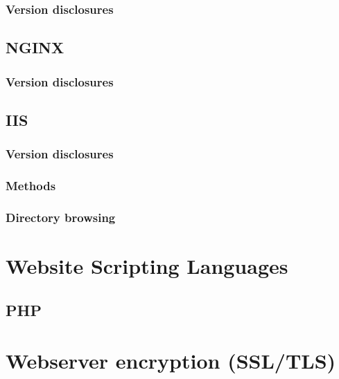 \documentclass[a4paper,12pt,twoside,openright,titlepage]{book}
\begin{document}
\subsection{Version disclosures}

\section{NGINX}
\subsection{Version disclosures}

\section{IIS}
\subsection{Version disclosures}

\subsection{Methods}

\subsection{Directory browsing}

%

\chapter{Website Scripting Languages}

\section{PHP}


\chapter{Webserver encryption (SSL/TLS)}

\end{document}
